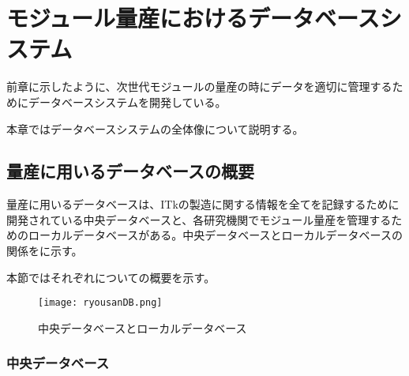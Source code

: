 \chapter{モジュール量産におけるデータベースシステム}
\label{sec:chap6}

前章に示したように、次世代モジュールの量産の時にデータを適切に管理するためにデータベースシステムを開発している。

本章ではデータベースシステムの全体像について説明する。


\section{量産に用いるデータベースの概要}
\label{sec:DBforMasspro}

量産に用いるデータベースは、ITkの製造に関する情報を全てを記録するために開発されている中央データベースと、各研究機関でモジュール量産を管理するためのローカルデータベースがある。中央データベースとローカルデータベースの関係をに示す。

本節ではそれぞれについての概要を示す。
\begin{figure}[tbp]
  \centering
  \texttt{[image: ryousanDB.png]}
  \caption[中央データベースとローカルデータベース]{中央データベースとローカルデータベース}
  \label{fig:ryousanDB}
\end{figure}

\subsection{中央データベース}
\label{sec:ITkPD}

